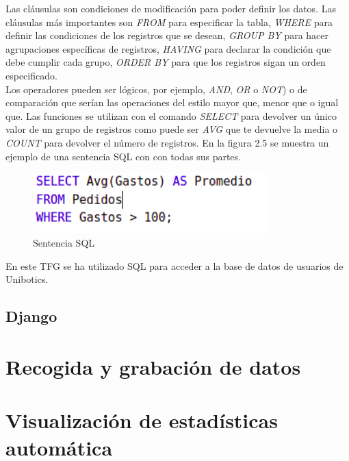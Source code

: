 \newpage
Las cláusulas son condiciones de modificación para poder definir los datos. Las cláusulas más importantes son \textit{FROM} para especificar la tabla, \textit{WHERE} para definir las condiciones de los registros que se desean, \textit{GROUP BY} para hacer agrupaciones específicas de registros, \textit{HAVING} para declarar la condición que debe cumplir cada grupo, \textit{ORDER BY} para que los registros sigan un orden especificado.\\

Los operadores pueden ser lógicos, por ejemplo, \textit{AND}, \textit{OR} o \textit{NOT}) o de comparación que serían las operaciones del estilo mayor que, menor que o igual que. Las funciones se utilizan con el comando \textit{SELECT} para devolver un único valor de un grupo de registros como puede ser\textit{ AVG }que te devuelve la media o \textit{COUNT }para devolver el número de registros. En la figura 2.5 se muestra un ejemplo de una sentencia SQL con con todas sus partes.\cite{sql}\\

\begin{figure}[H]
    \centering
    \includegraphics[width=9cm, keepaspectratio]{img/ejsql.png}
    \caption{Sentencia SQL}
    \label{fig:ejsql}
\end{figure}
En este TFG se ha utilizado SQL para acceder a la base de datos de usuarios de Unibotics.

\subsection{Django}
















\section{Recogida y grabación de datos}
\section{Visualización de estadísticas automática}